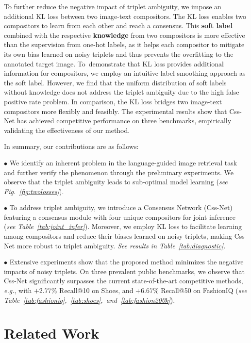 \documentclass[sigconf]{acmart}
\def\eg{\emph{e.g.}}
\begin{document}
To further reduce the negative impact of triplet ambiguity, we impose an additional KL loss between two image-text compositors. The KL loss enables two compositors to learn from each other and reach a consensus. This \textbf{soft label} combined with the respective \textbf{knowledge} from two compositors is more effective than the supervision from one-hot labels, as it helps each compositor to mitigate its own bias learned on noisy triplets and thus prevents the overfitting to the annotated target image. To demonstrate that KL loss provides additional information for compositors, we employ an intuitive label-smoothing approach as the soft label. However, we find that the uniform distribution of soft labels without knowledge does not address the triplet ambiguity due to the high false positive rate problem. In comparison, the KL loss bridges two image-text compositors more flexibly and feasibly.
The experimental results show that Css-Net has achieved competitive performance on three benchmarks, empirically validating the effectiveness of our method.

In summary, our contributions are as follows:

    $\bullet$ We identify an inherent problem in the language-guided image retrieval task and further verify the phenomenon through the preliminary experiments. We observe that the triplet ambiguity leads to sub-optimal model learning (\textit{see Fig.~\ref{fig:twolosses}}). 
    
    $\bullet$ To address triplet ambiguity, we introduce a Consensus Network (Css-Net) featuring a consensus module with four unique compositors for joint inference (\textit{see Table~\ref{tab:joint_infer}}). Moreover, we employ KL loss to facilitate learning among compositors and reduce their biases learned on noisy triplets, making Css-Net more robust to triplet ambiguity. \textit{See results in Table~\ref{tab:diagnostic}.}
    
    $\bullet$ Extensive experiments show that the proposed method minimizes the negative impacts of noisy triplets. On three prevalent public benchmarks, we observe that Css-Net significantly surpasses the current state-of-the-art competitive methods, \eg, with $+2.77\%$ Recall@10 on Shoes, and $+6.67\%$ Recall@50 on FashionIQ (\textit{see Table~\ref{tab:fashioniq},~\ref{tab:shoes},~and~\ref{tab:fashion200k}}).

\section{Related Work}
\end{document}
